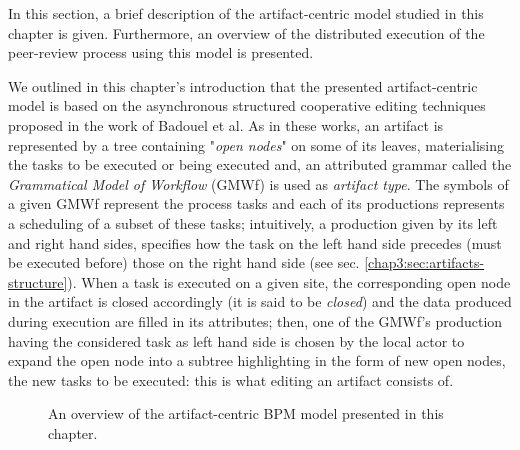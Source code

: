 \label{chap3:sec:model-overview}
In this section, a brief description of the artifact-centric model studied in this chapter is given. Furthermore, an overview of the distributed execution of the peer-review process using this model is presented.

\label{chap3:sec:model-description}
We outlined in this chapter's introduction that the presented artifact-centric model is based on the asynchronous structured cooperative editing techniques proposed in the work of Badouel et al. As in these works, an artifact is represented by a tree containing "\textit{open nodes}" on some of its leaves, materialising the tasks to be executed or being executed and, an attributed grammar called the \textit{Grammatical Model of Workflow} (GMWf) is used as \textit{artifact type}. The symbols of a given GMWf represent the process tasks and each of its productions represents a scheduling of a subset of these tasks; intuitively, a production given by its left and right hand sides, specifies how the task on the left hand side precedes (must be executed before) those on the right hand side (see sec. \ref{chap3:sec:artifacts-structure}).
When a task is executed on a given site, the corresponding open node in the artifact is closed accordingly (it is said to be \textit{closed}) and the data produced during execution are filled in its attributes; then, one of the GMWf's production having the considered task as left hand side is chosen by the local actor to expand the open node into a subtree highlighting in the form of new open nodes, the new tasks to be executed: this is what editing an artifact consists of.
\begin{figure}[ht!]
	\noindent
	\caption{An overview of the artifact-centric BPM model presented in this chapter.}
	\label{chap3:fig:overview-protocol}
\end{figure}

